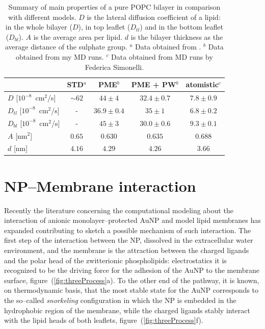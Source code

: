 \begin{table}[h!t]
	\centering
	\begin{tabular}{lcccc}
		\toprule
		\,				& STD$^a$	& \acs{PME}$^b$	& \acs{PME} + \acs{PW}$^b$ & atomistic$^c$ 	 \\ \toprule
		$D$	[$10^{-8}$~cm$^2$/s]	& $\sim62$	& $44 \pm 4$	& $32.4 \pm 0.7$ & $7.8 \pm 0.9$ \\ \midrule
		$D_{tl}$ [$10^{-8}$~cm$^2$/s] & -		& $36.9 \pm 0.4$& $35 \pm 1$	 & $6.8 \pm 0.2$ \\ \midrule
		$D_{bl}$ [$10^{-8}$~cm$^2$/s] & -		& $45 \pm 3$	& $30.0 \pm 0.6$ & $9.3 \pm 0.1$ \\ \midrule
		$A$ [nm$^2$]				& $0.65$	& $0.630$		& $0.635$		 & $0.688$		 \\ \midrule
		$d$ [nm]					& $4.16$	& $4.29$		& $4.26$ 		 & $3.66$		 \\ \bottomrule
	\end{tabular}
	\caption{Summary of main properties of a pure \acs{POPC} bilayer in comparison with different models. $D$ is the lateral diffusion coefficient of a lipid: in the whole bilayer ($D$), in top leaflet ($D_{tl}$) and in the bottom leaflet ($D_{bl}$). $A$ is the average area per lipid. $d$ is the bilayer thickness as the average distance of the sulphate group. \footnotesize $^a$ Data obtained from \cite{Rossi2014}. $^b$ Data obtained from my \ac{MD} runs. $^c$ Data obtained from \ac{MD} runs by Federica Simonelli.}
	\label{tab:POPCData}
\end{table}

\newpage
\section{NP--Membrane interaction}
Recently the literature concerning the computational modeling about the interaction of anionic 
monolayer--protected \ac{AuNP} and model lipid membranes has expanded contributing to sketch a possible mechanism 
of such interaction. The first step of the interaction between the \ac{NP}, dissolved in the extracellular 
water environment, and the membrane is the attraction between the charged ligands and the polar head of the 
zwitterionic phospholipids: electrostatics it is recognized to be the driving force for the adhesion of the 
\ac{AuNP} to the membrane surface, figure~(\ref{fig:threeProcess}a). To the other end of the pathway, it is 
known, on thermodynamic basis, that the most stable state for the \ac{AuNP} corresponds to the so--called 
\textit{snorkeling} configuration in which the \ac{NP} is embedded in the hydrophobic region of the membrane, 
while the charged ligands stably interact with the lipid heads of both leaflets, 
figure~(\ref{fig:threeProcess}f). 

